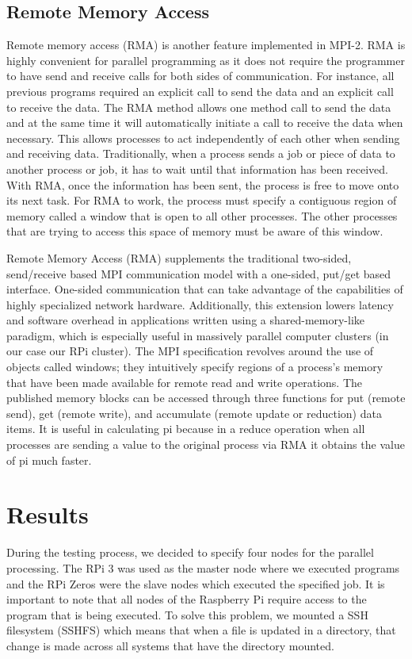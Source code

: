 \subsection {Remote Memory Access}
Remote memory access (RMA) is another feature implemented in MPI-2. RMA is highly convenient for parallel programming as it does not require the programmer to have send and receive calls for both sides of communication. For instance, all previous programs required an explicit call to send the data and an explicit call to receive the data. The RMA method allows one method call to send the data and at the same time it will automatically initiate a call to receive the data when necessary. This allows processes to act independently of each other when sending and receiving data. Traditionally, when a process sends a job or piece of data to another process or job, it has to wait until that information has been received. With RMA, once the information has been sent, the process is free to move onto its next task. For RMA to work, the process must specify a contiguous region of memory called a window that is open to all other processes. The other processes that are trying to access this space of memory must be aware of this window.

	Remote Memory Access (RMA) supplements the traditional two-sided, send/receive based MPI communication model with a one-sided, put/get based interface. One-sided communication that can take advantage of the capabilities of highly specialized network hardware. Additionally, this extension lowers latency and software overhead in applications written using a shared-memory-like paradigm, which is especially useful in massively parallel computer clusters (in our case our RPi cluster). The MPI specification revolves around the use of objects called windows; they intuitively specify regions of a process’s memory that have been made available for remote read and write operations. The published memory blocks can be accessed through three functions for put (remote send), get (remote write), and accumulate (remote update or reduction) data items. It is useful in calculating pi because in a reduce operation when all processes are sending a value to the original process via RMA it obtains the value of pi much faster.

\section{Results}
During the testing process, we decided to specify four nodes for the parallel processing. The RPi 3 was used as the master node where we executed programs and the RPi Zeros were the slave nodes which executed the specified job. It is important to note that all nodes of the Raspberry Pi require access to the program that is being executed. To solve this problem, we mounted a SSH filesystem (SSHFS) which means that when a file is updated in a directory, that change is made across all systems that have the directory mounted. 

